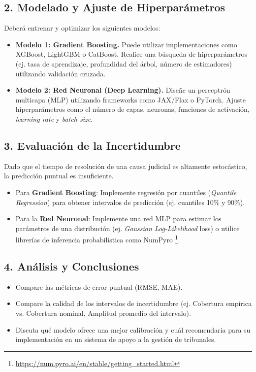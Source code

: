 \documentclass[11pt,a4paper]{article}
\begin{document}
\subsection{2. Modelado y Ajuste de Hiperparámetros}
Deberá entrenar y optimizar los siguientes modelos:
\begin{itemize}
    \item \textbf{Modelo 1: Gradient Boosting.} Puede utilizar implementaciones como XGBoost, LightGBM o CatBoost. Realice una búsqueda de hiperparámetros (ej. tasa de aprendizaje, profundidad del árbol, número de estimadores) utilizando validación cruzada.
    \item \textbf{Modelo 2: Red Neuronal (Deep Learning).} Diseñe un perceptrón multicapa (MLP) utilizando frameworks como JAX/Flax o PyTorch. Ajuste hiperparámetros como el número de capas, neuronas, funciones de activación, \textit{learning rate} y \textit{batch size}.
\end{itemize}

\subsection{3. Evaluación de la Incertidumbre}
Dado que el tiempo de resolución de una causa judicial es altamente estocástico, la predicción puntual es insuficiente.
\begin{itemize}
    \item Para \textbf{Gradient Boosting}: Implemente regresión por cuantiles (\textit{Quantile Regression}) para obtener intervalos de predicción (ej. cuantiles 10\% y 90\%).
    \item Para la \textbf{Red Neuronal}: Implemente una red MLP para estimar los parámetros de una distribución (ej. \textit{Gaussian Log-Likelihood} loss) o utilice librerías de inferencia probabilística como NumPyro \footnote{\url{https://num.pyro.ai/en/stable/getting_started.html}}.
\end{itemize}

\subsection{4. Análisis y Conclusiones}
\begin{itemize}
    \item Compare las métricas de error puntual (RMSE, MAE).
    \item Compare la calidad de los intervalos de incertidumbre (ej. Cobertura empírica vs. Cobertura nominal, Amplitud promedio del intervalo).
    \item Discuta qué modelo ofrece una mejor calibración y cuál recomendaría para su implementación en un sistema de apoyo a la gestión de tribunales.
\end{itemize}
\end{document}
